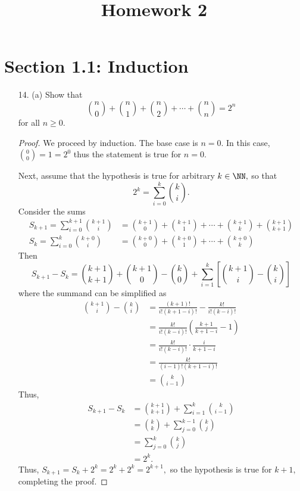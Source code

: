 \documentclass{article}
\begin{document}
\title{Homework 2}
\maketitle
\thispagestyle{fancy}

\section*{Section 1.1: Induction}
\begin{itemize}
	\item[14.] (a) Show that \[\binom{n}{0} + \binom{n}{1}+\binom{n}{2} + \cdots + \binom{n}{n} = 2^n\] for all $n\ge 0.$
		\begin{proof}
			We proceed by induction. The base case is $n=0.$ In this case, $\binom{0}{0}=1=2^0$ thus the statement is true for $n=0.$

			Next, assume that the hypothesis is true for arbitrary $k\in\NN,$ so that \[2^k=\sum_{i=0}^k \binom{k}{i}. \] Consider the sums
			\begin{align*}
				S_{k+1} =\sum_{i=0}^{k+1}\binom{k+1}{i}&= \binom{k+1}{0}+\binom{k+1}{1}+\cdots+\binom{k+1}{k}+\binom{k+1}{k+1} \\
				S_{k} =\sum_{i=0}^k \binom{k+0}{i} &=\binom{k+0}{0} + \binom{k+0}{1} +\cdots+\binom{k+0}{k}
			\end{align*} Then \[S_{k+1} - S_k = \binom{k+1}{k+1} + \binom{k+1}{0}-\binom{k}{0} + \sum_{i=1}^{k} \left[ \binom{k+1}{i}-\binom{k}{i} \right] \] where the summand can be simplified as
			\begin{align*}
				\binom{k+1}{i}-\binom{k}{i} &= \frac{(k+1)!}{i!(k+1-i)!}-\frac{k!}{i!(k-i)!} \\
				&= \frac{k!}{i!(k-i)!} \left( \frac{k+1}{k+1-i}-1 \right) \\
				&= \frac{k!}{i!(k-i)!}\cdot\frac{i}{k+1-i} \\
				&= \frac{k!}{(i-1)!(k+1-i)!} \\
				&= \binom{k}{i-1}
			\end{align*} Thus, 
			\begin{align*}
				S_{k+1}-S_k &= \binom{k+1}{k+1} + \sum_{i=1}^k\binom{k}{i-1} \\
				&= \binom{k}{k} +\sum_{j=0}^{k-1} \binom{k}{j} \\
				&= \sum_{j=0}^k \binom{k}{j} \\
				&= 2^k.
			\end{align*} Thus, $S_{k+1}= S_k+2^k=2^k+2^k=2^{k+1},$ so the hypothesis is true for $k+1,$ completing the proof. 


\end{proof}
\end{itemize}
\end{document}
